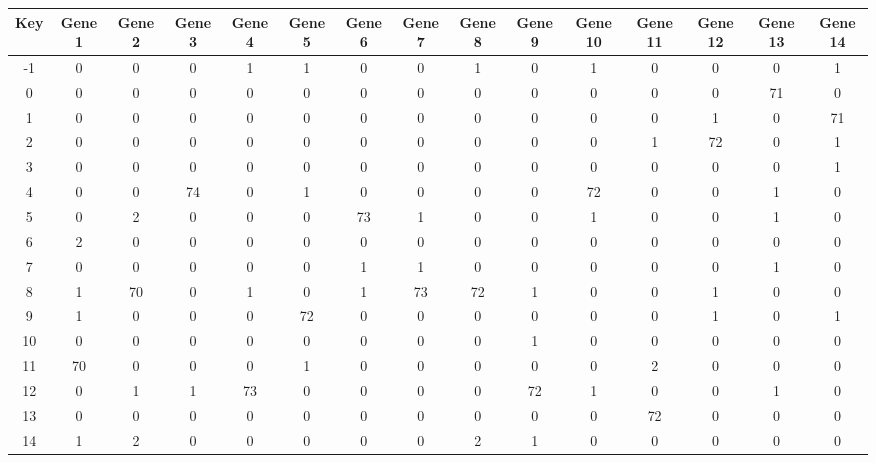 \begin{tabular}{|c|c|c|c|c|c|c|c|c|c|c|c|c|c|c|}
\hline
Key & Gene 1 & Gene 2 & Gene 3 & Gene 4 & Gene 5 & Gene 6 & Gene 7 & Gene 8 & Gene 9 & Gene 10 & Gene 11 & Gene 12 & Gene 13 & Gene 14 \\
\hline
-1 & 0 & 0 & 0 & 1 & 1 & 0 & 0 & 1 & 0 & 1 & 0 & 0 & 0 & 1 \\
0 & 0 & 0 & 0 & 0 & 0 & 0 & 0 & 0 & 0 & 0 & 0 & 0 & 71 & 0 \\
1 & 0 & 0 & 0 & 0 & 0 & 0 & 0 & 0 & 0 & 0 & 0 & 1 & 0 & 71 \\
2 & 0 & 0 & 0 & 0 & 0 & 0 & 0 & 0 & 0 & 0 & 1 & 72 & 0 & 1 \\
3 & 0 & 0 & 0 & 0 & 0 & 0 & 0 & 0 & 0 & 0 & 0 & 0 & 0 & 1 \\
4 & 0 & 0 & 74 & 0 & 1 & 0 & 0 & 0 & 0 & 72 & 0 & 0 & 1 & 0 \\
5 & 0 & 2 & 0 & 0 & 0 & 73 & 1 & 0 & 0 & 1 & 0 & 0 & 1 & 0 \\
6 & 2 & 0 & 0 & 0 & 0 & 0 & 0 & 0 & 0 & 0 & 0 & 0 & 0 & 0 \\
7 & 0 & 0 & 0 & 0 & 0 & 1 & 1 & 0 & 0 & 0 & 0 & 0 & 1 & 0 \\
8 & 1 & 70 & 0 & 1 & 0 & 1 & 73 & 72 & 1 & 0 & 0 & 1 & 0 & 0 \\
9 & 1 & 0 & 0 & 0 & 72 & 0 & 0 & 0 & 0 & 0 & 0 & 1 & 0 & 1 \\
10 & 0 & 0 & 0 & 0 & 0 & 0 & 0 & 0 & 1 & 0 & 0 & 0 & 0 & 0 \\
11 & 70 & 0 & 0 & 0 & 1 & 0 & 0 & 0 & 0 & 0 & 2 & 0 & 0 & 0 \\
12 & 0 & 1 & 1 & 73 & 0 & 0 & 0 & 0 & 72 & 1 & 0 & 0 & 1 & 0 \\
13 & 0 & 0 & 0 & 0 & 0 & 0 & 0 & 0 & 0 & 0 & 72 & 0 & 0 & 0 \\
14 & 1 & 2 & 0 & 0 & 0 & 0 & 0 & 2 & 1 & 0 & 0 & 0 & 0 & 0 \\
\hline
\end{tabular}
